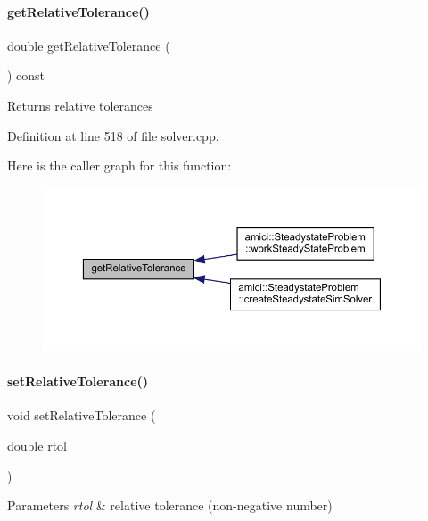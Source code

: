 \paragraph{\texorpdfstring{get\+Relative\+Tolerance()}{getRelativeTolerance()}}
{\footnotesize\ttfamily double get\+Relative\+Tolerance (\begin{DoxyParamCaption}{ }\end{DoxyParamCaption}) const}

\begin{DoxyReturn}{Returns}
relative tolerances 
\end{DoxyReturn}


Definition at line 518 of file solver.\+cpp.

Here is the caller graph for this function\+:
\nopagebreak
\begin{figure}[H]
\begin{center}
\leavevmode
\includegraphics[width=350pt]{classamici_1_1_solver_a54fe1b062315ed19b2dbf88206415e06_icgraph}
\end{center}
\end{figure}
\mbox{\label{classamici_1_1_solver_afb5f0c48f24e4bc3efad8ef599adde56}} 
\paragraph{\texorpdfstring{set\+Relative\+Tolerance()}{setRelativeTolerance()}}
{\footnotesize\ttfamily void set\+Relative\+Tolerance (\begin{DoxyParamCaption}\item[{double}]{rtol }\end{DoxyParamCaption})}


\begin{DoxyParams}{Parameters}
{\em rtol} & relative tolerance (non-\/negative number) \\
\hline
\end{DoxyParams}


